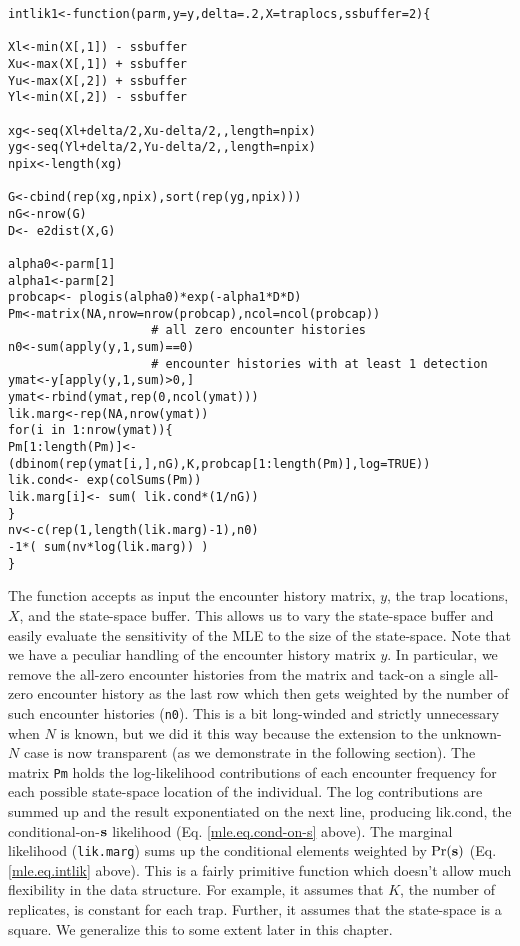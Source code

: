 {\small 
\begin{verbatim}
intlik1<-function(parm,y=y,delta=.2,X=traplocs,ssbuffer=2){

Xl<-min(X[,1]) - ssbuffer 
Xu<-max(X[,1]) + ssbuffer
Yu<-max(X[,2]) + ssbuffer
Yl<-min(X[,2]) - ssbuffer

xg<-seq(Xl+delta/2,Xu-delta/2,,length=npix) 
yg<-seq(Yl+delta/2,Yu-delta/2,,length=npix) 
npix<-length(xg)

G<-cbind(rep(xg,npix),sort(rep(yg,npix)))
nG<-nrow(G)
D<- e2dist(X,G)  

alpha0<-parm[1]
alpha1<-parm[2]
probcap<- plogis(alpha0)*exp(-alpha1*D*D)
Pm<-matrix(NA,nrow=nrow(probcap),ncol=ncol(probcap))
                    # all zero encounter histories
n0<-sum(apply(y,1,sum)==0) 
                    # encounter histories with at least 1 detection
ymat<-y[apply(y,1,sum)>0,] 
ymat<-rbind(ymat,rep(0,ncol(ymat)))
lik.marg<-rep(NA,nrow(ymat))
for(i in 1:nrow(ymat)){
Pm[1:length(Pm)]<- (dbinom(rep(ymat[i,],nG),K,probcap[1:length(Pm)],log=TRUE))
lik.cond<- exp(colSums(Pm))
lik.marg[i]<- sum( lik.cond*(1/nG))  
}
nv<-c(rep(1,length(lik.marg)-1),n0)
-1*( sum(nv*log(lik.marg)) )
}
\end{verbatim}
}


The function accepts as input the encounter history matrix, $y$, the
trap locations, $X$, and the state-space buffer. This allows us to
vary the state-space buffer and easily evaluate the sensitivity of the
MLE to the size of the state-space.  Note that we have a peculiar
handling of the encounter history matrix $y$. In particular, we remove
the all-zero encounter histories from the matrix and tack-on a single
all-zero encounter history as the last row which then gets weighted by
the number of such encounter histories (\mbox{\tt n0}). This is a bit
long-winded and strictly unnecessary when $N$ is known, but we did it
this way because the extension to the unknown-$N$ case is now
transparent (as we demonstrate in the following section).  The matrix
\mbox{\tt Pm} holds the log-likelihood contributions of each encounter
frequency for each possible state-space location of the individual.
The log contributions are summed up and the result exponentiated on
the next line, producing lik.cond, the conditional-on-${\bf s}$
likelihood (Eq. \ref{mle.eq.cond-on-s} above). The marginal likelihood
(\mbox{\tt lik.marg}) sums up the conditional elements weighted by
$\Pr({\bf s})$ (Eq. \ref{mle.eq.intlik} above).  This is a fairly
primitive function which doesn't allow much flexibility in the data
structure. For example, it assumes that $K$, the number of replicates,
is constant for each trap. Further, it assumes that the state-space is
a square. We generalize this to some extent later in this chapter.

